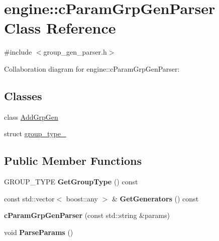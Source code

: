 \hypertarget{classengine_1_1cParamGrpGenParser}{\section{engine\-:\-:c\-Param\-Grp\-Gen\-Parser Class Reference}
\label{classengine_1_1cParamGrpGenParser}
}


{\ttfamily \#include $<$group\-\_\-gen\-\_\-parser.\-h$>$}



Collaboration diagram for engine\-:\-:c\-Param\-Grp\-Gen\-Parser\-:
\subsection*{Classes}
\begin{DoxyCompactItemize}
\item 
class \hyperlink{classengine_1_1cParamGrpGenParser_1_1AddGrpGen}{Add\-Grp\-Gen}
\item 
struct \hyperlink{structengine_1_1cParamGrpGenParser_1_1group__type__}{group\-\_\-type\-\_\-}
\end{DoxyCompactItemize}
\subsection*{Public Member Functions}
\begin{DoxyCompactItemize}
\item 
\hypertarget{classengine_1_1cParamGrpGenParser_aef7eee0ed4cda2da8e7b7e18d538005f}{G\-R\-O\-U\-P\-\_\-\-T\-Y\-P\-E {\bfseries Get\-Group\-Type} () const }\label{classengine_1_1cParamGrpGenParser_aef7eee0ed4cda2da8e7b7e18d538005f}

\item 
\hypertarget{classengine_1_1cParamGrpGenParser_a77b35ea5df765859b0bb132bfade9d37}{const std\-::vector$<$ boost\-::any $>$ \& {\bfseries Get\-Generators} () const }\label{classengine_1_1cParamGrpGenParser_a77b35ea5df765859b0bb132bfade9d37}

\item 
\hypertarget{classengine_1_1cParamGrpGenParser_ab2b4e98606a9a573e6a9e0aacc1ccda2}{{\bfseries c\-Param\-Grp\-Gen\-Parser} (const std\-::string \&params)}\label{classengine_1_1cParamGrpGenParser_ab2b4e98606a9a573e6a9e0aacc1ccda2}

\item 
\hypertarget{classengine_1_1cParamGrpGenParser_ab815bca7423e45618397388f819d1bb4}{void {\bfseries Parse\-Params} ()}\label{classengine_1_1cParamGrpGenParser_ab815bca7423e45618397388f819d1bb4}

\end{DoxyCompactItemize}
